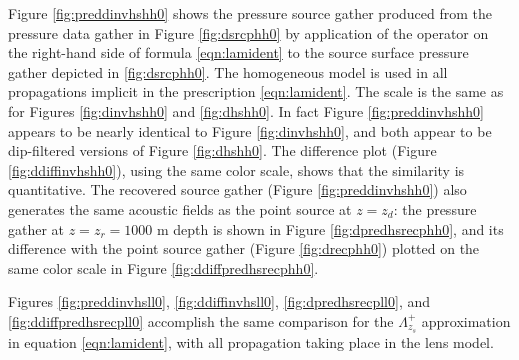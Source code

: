 Figure \ref{fig:preddinvhshh0} shows the pressure source gather
produced from the pressure data gather in Figure \ref{fig:dsrcphh0} by
application of the operator on the right-hand side of formula
\ref{eqn:lamident} to the source surface pressure gather depicted in
\ref{fig:dsrcphh0}. The homogeneous model is used in all propagations
implicit in the prescription \ref{eqn:lamident}. The scale is the same
as for Figures \ref{fig:dinvhshh0} and \ref{fig:dhshh0}. In fact
Figure \ref{fig:preddinvhshh0} appears to be nearly identical to
Figure \ref{fig:dinvhshh0}, and both appear to be dip-filtered
versions of Figure \ref{fig:dhshh0}. The difference plot (Figure
  \ref{fig:ddiffinvhshh0}), using the same color scale, shows that the
  similarity is quantitative. The recovered source gather (Figure
  \ref{fig:preddinvhshh0}) also generates the same acoustic fields as
  the point source at $z=z_d$: the pressure gather at $z=z_r=1000$ m
  depth is shown in Figure \ref{fig:dpredhsrecphh0}, and its
  difference with the point source gather (Figure \ref{fig:drecphh0})
  plotted on the same color scale in Figure
  \ref{fig:ddiffpredhsrecphh0}.

Figures \ref{fig:preddinvhsll0}, \ref{fig:ddiffinvhsll0},
\ref{fig:dpredhsrecpll0}, and \ref{fig:ddiffpredhsrecpll0} accomplish
the same comparison for the $\Lambda^+_{z_s}$ approximation in
equation \ref{eqn:lamident}, with all propagation taking place in the
lens model.

